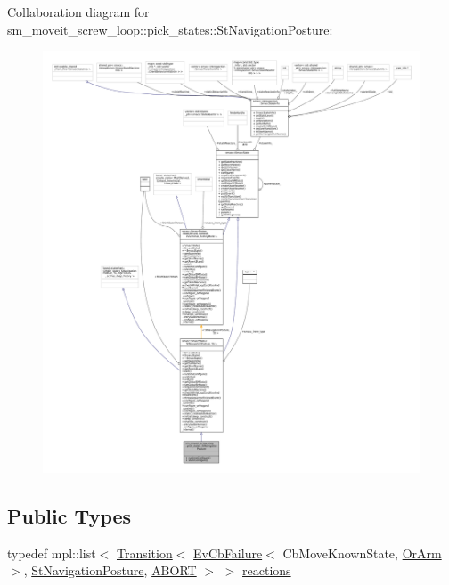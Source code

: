 Collaboration diagram for sm\+\_\+moveit\+\_\+screw\+\_\+loop\+:\+:pick\+\_\+states\+:\+:St\+Navigation\+Posture\+:
\nopagebreak
\begin{figure}[H]
\begin{center}
\leavevmode
\includegraphics[width=350pt]{structsm__moveit__screw__loop_1_1pick__states_1_1StNavigationPosture__coll__graph}
\end{center}
\end{figure}
\subsection*{Public Types}
\begin{DoxyCompactItemize}
\item 
typedef mpl\+::list$<$ \hyperlink{classsmacc_1_1Transition}{Transition}$<$ \hyperlink{structsmacc_1_1EvCbFailure}{Ev\+Cb\+Failure}$<$ Cb\+Move\+Known\+State, \hyperlink{classsm__moveit__screw__loop_1_1OrArm}{Or\+Arm} $>$, \hyperlink{structsm__moveit__screw__loop_1_1pick__states_1_1StNavigationPosture}{St\+Navigation\+Posture}, \hyperlink{structsmacc_1_1default__transition__tags_1_1ABORT}{A\+B\+O\+RT} $>$ $>$ \hyperlink{structsm__moveit__screw__loop_1_1pick__states_1_1StNavigationPosture_a4f22b6ddea2186c8f2a16859c03928e9}{reactions}
\end{DoxyCompactItemize}

